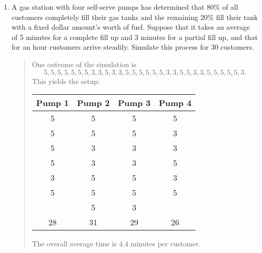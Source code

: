 \documentclass{hw}
\begin{document}
\begin{enumerate}
\newpage
\item A gas station with four self-serve pumps has determined that 80\% of all customers completely fill
their gas tanks and the remaining 20\% fill their tank with a fixed dollar amount's worth of fuel. Suppose
that it takes an average of 5 minutes for a complete fill up and 3 minutes for a partial fill up, and that
for an hour customers arrive steadily. Simulate this process for 30 customers.
\begin{quote}
One outcome of the simulation is
\[5,5,5,5,5,5,5,3,3,5,3,3,5,5,5,5,5,5,3,3,5,5,3,3,5,5,5,5,5,3.\]
This yields the setup:
\begin{center}
\begin{tabular}{c|c|c|c}
Pump 1 & Pump 2 & Pump 3 & Pump 4\\
\hline
5 & 5 & 5 & 5\\
5 & 5 & 5 & 3\\
5 & 3 & 3 & 3\\
5 & 3 & 3 & 5\\
3 & 5 & 5 & 3\\
5 & 5 & 5 & 5\\
  & 5 & 3 &  \\
\hline
28 & 31 & 29 & 26
\end{tabular}
\end{center}
The overall average time is 4.4 minutes per customer.
\end{quote}


\end{enumerate}
\end{document}
